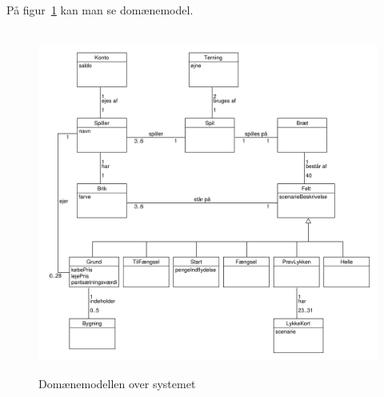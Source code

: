 \documentclass[class=article, crop=false]{standalone}
\begin{document}
    På figur~\ref{fig:domain_model} kan man se domænemodel.

            \begin{figure}[H]

                \hbox{\hspace{-2cm} \includegraphics[scale=0.7]{diagrams/domain_model.pdf}}

                \caption{Domænemodellen over systemet}\label{fig:domain_model}
            \end{figure}
\end{document}
